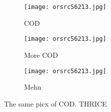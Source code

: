 \documentclass{article}
\begin{document}
	\begin{figure}
		\centering
		\begin{subfigure}[a]{0.4\linewidth}
			
		\texttt{[image: orsrc56213.jpg]}
		    \caption{COD}
		\end{subfigure}
	    \begin{subfigure}[b]{0.4\linewidth}
	    	
	    	\texttt{[image: orsrc56213.jpg]}
	    	\caption{More COD}
	    	\end{subfigure}
    	\begin{subfigure}[c]{1.5\linewidth}
    		
    		\texttt{[image: orsrc56213.jpg]}
    		\caption{Mehn}
    		\end{subfigure}
    		\caption{The same picx of COD. THRICE}
    		\label{fig:orsrc56213}
	\end{figure}
\end{document}
